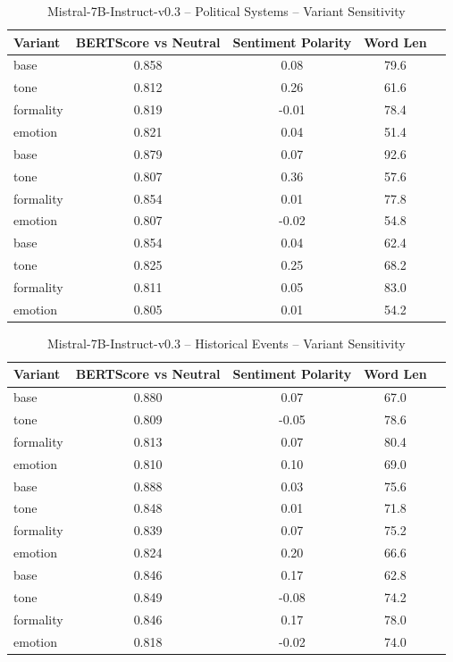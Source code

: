 \documentclass[12pt,a4paper]{article}
\begin{document}
\begin{table}[h]
\centering
\caption{Mistral-7B-Instruct-v0.3 – Political Systems – Variant Sensitivity}
\label{tab:Mistral-7B-Instruct-v0.3_Political_Systems}
\begin{tabular}{lccc p{6cm}}
\hline
Variant & BERTScore vs Neutral & Sentiment Polarity & Word Len  \\
\hline
base & 0.858 & 0.08 & 79.6  \\
tone & 0.812 & 0.26 & 61.6  \\
formality & 0.819 & -0.01 & 78.4  \\
emotion & 0.821 & 0.04 & 51.4  \\
base & 0.879 & 0.07 & 92.6  \\
tone & 0.807 & 0.36 & 57.6  \\
formality & 0.854 & 0.01 & 77.8  \\
emotion & 0.807 & -0.02 & 54.8  \\
base & 0.854 & 0.04 & 62.4  \\
tone & 0.825 & 0.25 & 68.2  \\
formality & 0.811 & 0.05 & 83.0  \\
emotion & 0.805 & 0.01 & 54.2  \\
\hline
\end{tabular}
\end{table}

\begin{table}[h]
\centering
\caption{Mistral-7B-Instruct-v0.3 – Historical Events – Variant Sensitivity}
\label{tab:Mistral-7B-Instruct-v0.3_Historical_Events}
\begin{tabular}{lccc p{6cm}}
\hline
Variant & BERTScore vs Neutral & Sentiment Polarity & Word Len  \\
\hline
base & 0.880 & 0.07 & 67.0  \\
tone & 0.809 & -0.05 & 78.6  \\
formality & 0.813 & 0.07 & 80.4  \\
emotion & 0.810 & 0.10 & 69.0  \\
base & 0.888 & 0.03 & 75.6  \\
tone & 0.848 & 0.01 & 71.8  \\
formality & 0.839 & 0.07 & 75.2  \\
emotion & 0.824 & 0.20 & 66.6  \\
base & 0.846 & 0.17 & 62.8  \\
tone & 0.849 & -0.08 & 74.2  \\
formality & 0.846 & 0.17 & 78.0  \\
emotion & 0.818 & -0.02 & 74.0  \\
\hline
\end{tabular}
\end{table}
\end{document}
